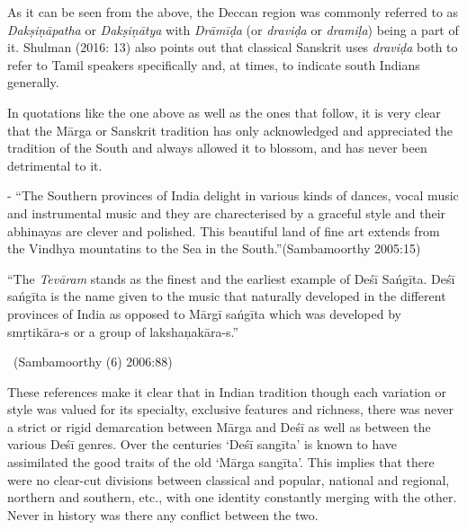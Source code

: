 As it can be seen from the above, the Deccan region was commonly referred to as \textit{Dakṣiṇāpatha} or \textit{Dakṣiṇātya} with \textit{Drāmīḍa} (or \textit{draviḍa} or \textit{dramiḷa}) being a part of it. Shulman (2016: 13) also points out that classical Sanskrit uses \textit{draviḍa} both to refer to Tamil speakers specifically and, at times, to indicate south Indians generally.

In quotations like the one above as well as the ones that follow, it is very clear that the Mārga or Sanskrit tradition has only acknowledged and appreciated the tradition of the South and always allowed it to blossom, and has never been detrimental to it.

\begin{myquote}
 - “The Southern provinces of India delight in various kinds of dances, vocal music and instrumental music and they are charecterised by a graceful style and their abhinayas are clever and polished. This beautiful land of fine art extends from the Vindhya mountatins to the Sea in the South.”\hfill (Sambamoorthy 2005:15)
\end{myquote}

\begin{myquote}
“The \textit{Tevāram} stands as the finest and the earliest example of Deśī Sańgīta. Deśī sańgīta is the name given to the music that naturally developed in the different provinces of India as opposed to Mārgī sańgīta which was developed by smṛtikāra-s or a group of lakshaņakāra-s.”

~\hfill (Sambamoorthy (6) 2006:88)
\end{myquote}

These references make it clear that in Indian tradition though each variation or style was valued for its specialty, exclusive features and richness, there was never a strict or rigid demarcation between Mārga and Deśī as well as between the various Deśī genres. Over the centuries ‘Deśī sangīta’ is known to have assimilated the good traits of the old ‘Mārga sangīta’. This implies that there were no clear-cut divisions between classical and popular, national and regional, northern and southern, etc., with one identity constantly merging with the other. Never in history was there any conflict between the two.

